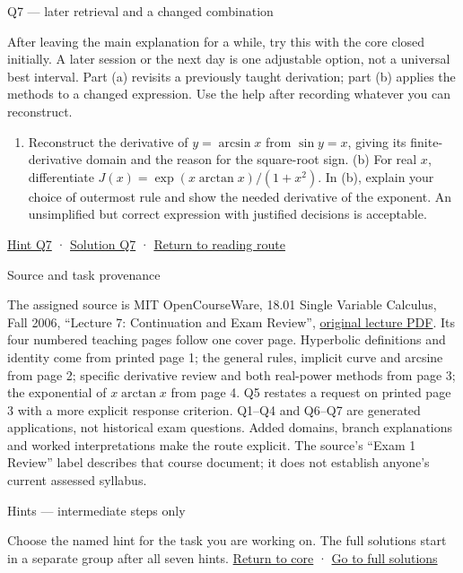 \documentclass[
  11pt,
]{article}
\providecommand{\tightlist}{%
  \setlength{\itemsep}{0pt}\setlength{\parskip}{0pt}}
\begin{document}
Q7 --- later retrieval and a changed combination

After leaving the main explanation for a while, try this with the core
closed initially. A later session or the next day is one adjustable
option, not a universal best interval. Part (a) revisits a previously
taught derivation; part (b) applies the methods to a changed expression.
Use the help after recording whatever you can reconstruct.

\begin{enumerate}
\def\labelenumi{(\alph{enumi})}
\tightlist
\item
  Reconstruct the derivative of \(y=\arcsin x\) from \(\sin y=x\),
  giving its finite-derivative domain and the reason for the square-root
  sign. (b) For real \(x\), differentiate
  \(J(x)=\exp(x\arctan x)/(1+x^2)\). In (b), explain your choice of
  outermost rule and show the needed derivative of the exponent. An
  unsimplified but correct expression with justified decisions is
  acceptable.
\end{enumerate}

\protect\hyperlink{hint-q7}{Hint Q7} ·
\protect\hyperlink{solution-q7}{Solution Q7} ·
\protect\hyperlink{route}{Return to reading route}

Source and task provenance

The assigned source is MIT OpenCourseWare, 18.01 Single Variable
Calculus, Fall 2006, ``Lecture 7: Continuation and Exam Review'',
\href{https://ocw.mit.edu/courses/18-01-single-variable-calculus-fall-2006/a30756fe9d577184f205b09bc6d6d005_lec7.pdf}{original
lecture PDF}. Its four numbered teaching pages follow one cover page.
Hyperbolic definitions and identity come from printed page 1; the
general rules, implicit curve and arcsine from page 2; specific
derivative review and both real-power methods from page 3; the
exponential of \(x\arctan x\) from page 4. Q5 restates a request on
printed page 3 with a more explicit response criterion. Q1--Q4 and
Q6--Q7 are generated applications, not historical exam questions. Added
domains, branch explanations and worked interpretations make the route
explicit. The source's ``Exam 1 Review'' label describes that course
document; it does not establish anyone's current assessed syllabus.

Hints --- intermediate steps only

Choose the named hint for the task you are working on. The full
solutions start in a separate group after all seven hints.
\protect\hyperlink{core}{Return to core} ·
\protect\hyperlink{solutions}{Go to full solutions}
\end{document}
